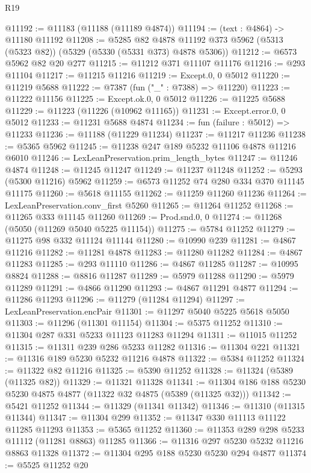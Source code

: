 \begin{lexlean}{R19}
\begin{coremodule}
@11192 := @11183 (@11188 (@11189 @4874))
@11194 := (text : @4864) -> @11180 @11192
@11208 := @5285
    @82
    @4878
    @11192
    @373
    @5962
    (@5313 (@5323 @82))
    (@5329 (@5330 (@5331 @373) @4878 @5306))
@11212 := @6573 @5962 @82 @20 @277
@11215 := @11212 @371 @11107 @11176
@11216 := @293 @11104
@11217 := @11215 @11216
@11219 := Except.{0, 0} @5012
@11220 := @11219 @5688
@11222 := @7387 (fun ("_" : @7388) => @11220)
@11223 := @11222 @11156
@11225 := Except.ok.{0, 0} @5012
@11226 := @11225 @5688
@11229 := @11223 (@11226 (@10962 @11165))
@11231 := Except.error.{0, 0} @5012
@11233 := @11231 @5688 @4874
@11234 := fun (failure : @5012) => @11233
@11236 := @11188 (@11229 @11234)
@11237 := @11217 @11236
@11238 := @5365 @5962
@11245 := @11238 @247 @189 @5232 @11106 @4878 @11216 @6010
@11246 := LexLeanPreservation.prim_length_bytes
@11247 := @11246 @4874
@11248 := @11245 @11247
@11249 := @11237 @11248
@11252 := @5293 (@5300 @11216) @5962
@11259 := @6573 @11252 @74 @280 @334 @370 @11145 @11175
@11260 := @5618 @11155
@11262 := @11259 @11260 @11236
@11264 := LexLeanPreservation.conv_first @5260
@11265 := @11264 @11252
@11268 := @11265 @333 @11145 @11260
@11269 := Prod.snd.{0, 0}
@11274 := @11268 (@5050 (@11269 @5040 @5225 @11154))
@11275 := @5784 @11252
@11279 := @11275 @98 @332 @11124 @11144
@11280 := @10990 @239
@11281 := @4867 @11216
@11282 := @11281 @4878
@11283 := @11280 @11282
@11284 := @4867 @11283
@11285 := @293 @11110
@11286 := @4867 @11285
@11287 := @10995 @8824
@11288 := @8816 @11287
@11289 := @5979 @11288
@11290 := @5979 @11289
@11291 := @4866 @11290
@11293 := @4867 @11291 @4877
@11294 := @11286 @11293
@11296 := @11279 (@11284 @11294)
@11297 := LexLeanPreservation.encPair
@11301 := @11297 @5040 @5225 @5618 @5050
@11303 := @11296 (@11301 @11154)
@11304 := @5375 @11252
@11310 := @11304 @287 @331 @5233 @11123 @11283 @11294
@11311 := @11015 @11252
@11315 := @11311 @239 @286 @5233 @11282
@11316 := @11304 @221
@11321 := @11316 @189 @5230 @5232 @11216 @4878
@11322 := @5384 @11252
@11324 := @11322 @82 @11216
@11325 := @5390 @11252
@11328 := @11324 (@5389 (@11325 @82))
@11329 := @11321 @11328
@11341 := @11304 @186 @188 @5230 @5230 @4875 @4877 (@11322 @32 @4875 (@5389 (@11325 @32)))
@11342 := @5421 @11252
@11344 := @11329 (@11341 @11342)
@11346 := @11310 (@11315 @11344)
@11347 := @11304 @299
@11352 := @11347 @330 @11113 @11122 @11285 @11293
@11353 := @5365 @11252
@11360 := @11353 @289 @298 @5233 @11112 (@11281 @8863) @11285
@11366 := @11316 @297 @5230 @5232 @11216 @8863 @11328
@11372 := @11304 @295 @188 @5230 @5230 @294 @4877
@11374 := @5525 @11252 @20

\end{coremodule}
\end{lexlean}
